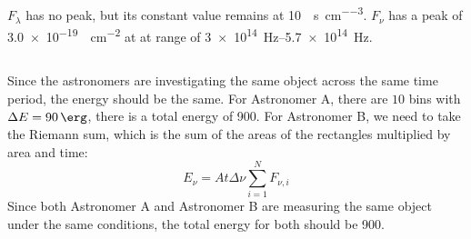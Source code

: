 \documentclass{article}
\begin{document}
\subsection{}

\(F_\lambda\) has no peak, but its constant value remains at \SI{10}{\erg\per\second\per\centi\meter\cubed}.
\(F_\nu\) has a peak of \SI{3.0e-19}{\erg\per\centi\meter\squared} at at range of \SI{3e+14}{\hertz}--\SI{5.7e+14}{\hertz}.

\subsection{}

Since the astronomers are investigating the same object across the same time period, the energy should be the same.
For Astronomer A, there are \(10\) bins with \(\Delta E = \SI{90}{\erg}\), there is a total energy of \SI{900}{\erg}.
For Astronomer B, we need to take the Riemann sum, which is the sum of the areas of the rectangles multiplied by area and time:
\begin{equation}
    E_\nu = A t \Delta \nu \sum_{i = 1}^N F_{\nu, i}
\end{equation}
Since both Astronomer A and Astronomer B are measuring the same object under the same conditions, the total energy for both should be \SI{900}{\erg}.

\subsection{}
\end{document}
